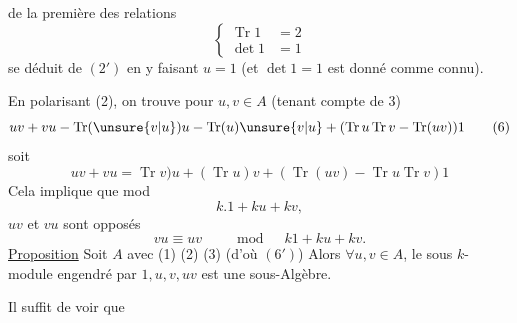 de la première des relations
\[ \left\{\begin{aligned}\operatorname{Tr}1&=2\\ \det 1&=1\end{aligned}\right. \tag*{(5)} \]
 se déduit  de $(2')$ en y faisant $u=1$ (et $\det 1=1$ est donné comme connu).

En polarisant (2), on trouve pour $u,v\in A$ (tenant compte de 3)
\[ uv+vu-\operatorname{Tr}(\unsure{v|u})u-\operatorname{Tr}(u)\unsure{v|u}+(\operatorname{Tr}u\operatorname{Tr}v-\operatorname{Tr}(uv))1 \tag*{(6)} \]
soit
\[ uv+vu=\operatorname{Tr}v)u+(\operatorname{Tr}u)v+(\operatorname{Tr}(uv)-\operatorname{Tr}u\operatorname{Tr}v)1 \tag*{$(6')$} \]
 Cela  implique que mod
\[ k.1+ku+kv, \]
$uv$ et $vu$ sont  opposés
\[ vu\equiv uv\qquad\bmod\quad k1+ku+kv. \]
\uline{Proposition} Soit $A$ avec (1) (2) (3) (d'où $(6')$) Alors $\forall u,v\in A$,  le sous $k$-module engendré par $1,u,v,uv$ est une sous-Algèbre.

Il suffit de voir que 
